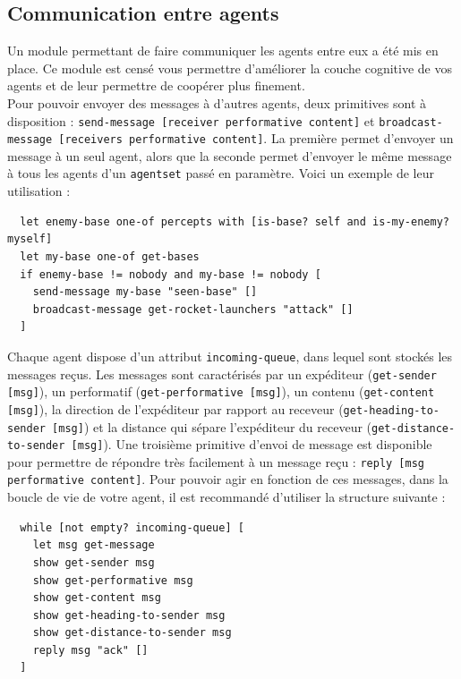 \documentclass[a4paper,11pt]{article}
\begin{document}
\subsection*{Communication entre agents}

Un module permettant de faire communiquer les agents entre eux a été mis en place. Ce module est
censé vous permettre d'améliorer la couche cognitive de vos agents et de leur permettre de coopérer
plus finement.\\

Pour pouvoir envoyer des messages à d'autres agents, deux primitives sont à disposition :
\texttt{send-message [receiver performative content]} et \texttt{broadcast-message [receivers
performative content]}. La première permet d'envoyer un message à un seul agent, alors que la
seconde permet d'envoyer le même message à tous les agents d'un \texttt{agentset} passé en
paramètre. Voici un exemple de leur utilisation :

\begin{verbatim}
  let enemy-base one-of percepts with [is-base? self and is-my-enemy? myself]
  let my-base one-of get-bases
  if enemy-base != nobody and my-base != nobody [
    send-message my-base "seen-base" [] 
    broadcast-message get-rocket-launchers "attack" [] 
  ]
\end{verbatim}

Chaque agent dispose d'un attribut \texttt{incoming-queue}, dans lequel sont stockés les messages
reçus. Les messages sont caractérisés par un expéditeur (\texttt{get-sender [msg]}), un performatif
(\texttt{get-performative [msg]}), un contenu (\texttt{get-content [msg]}), la direction de
l'expéditeur par rapport au receveur (\texttt{get-heading-to-sender [msg]}) et la distance qui
sépare l'expéditeur du receveur (\texttt{get-distance-to-sender [msg]}). Une troisième primitive
d'envoi de message est disponible pour permettre de répondre très facilement à un message reçu :
\texttt{reply [msg performative content]}. Pour pouvoir agir en fonction de ces messages, dans la
boucle de vie de votre agent, il est recommandé d'utiliser la structure suivante :

\begin{verbatim}
  while [not empty? incoming-queue] [
    let msg get-message
    show get-sender msg
    show get-performative msg
    show get-content msg
    show get-heading-to-sender msg
    show get-distance-to-sender msg
    reply msg "ack" []
  ]
\end{verbatim}
\end{document}
